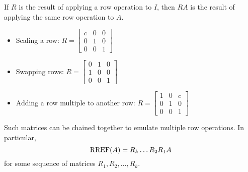 \begin{applicationActivities}
\begin{fact}
If \(R\) is the result of applying a row operation to \(I\), then
\(RA\) is the result of applying the same row operation to \(A\).
\begin{itemize}
\item Scaling a row: \(R=
  \begin{bmatrix}
  c & 0 & 0 \\
  0 & 1 & 0 \\
  0 & 0 & 1
  \end{bmatrix}
\)
\item Swapping rows: \(R=
  \begin{bmatrix}
  0 & 1 & 0 \\
  1 & 0 & 0 \\
  0 & 0 & 1
  \end{bmatrix}
\)
\item Adding a row multiple to another row: \(R=
  \begin{bmatrix}
  1 & 0 & c \\
  0 & 1 & 0 \\
  0 & 0 & 1
  \end{bmatrix}
\)
\end{itemize}

Such matrices can be chained together to emulate multiple row operations.
In particular,
\[\operatorname{RREF}(A)=R_k\dots R_2R_1A\]
for some sequence of matrices \(R_1,R_2,\dots,R_k\).
\end{fact}


\end{applicationActivities}
